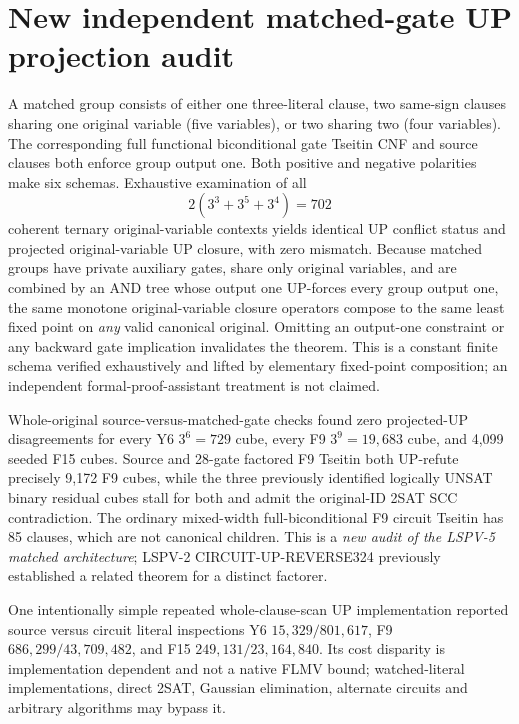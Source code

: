 \documentclass[11pt]{article}
\begin{document}
\section{New independent matched-gate UP projection audit}
A matched group consists of either one three-literal clause, two same-sign clauses sharing one original variable (five variables), or two sharing two (four variables). The corresponding full functional biconditional gate Tseitin CNF and source clauses both enforce group output one. Both positive and negative polarities make six schemas. Exhaustive examination of all
\[
2(3^3+3^5+3^4)=702
\]
coherent ternary original-variable contexts yields identical UP conflict status and projected original-variable UP closure, with zero mismatch. Because matched groups have private auxiliary gates, share only original variables, and are combined by an AND tree whose output one UP-forces every group output one, the same monotone original-variable closure operators compose to the same least fixed point on \emph{any} valid canonical original. Omitting an output-one constraint or any backward gate implication invalidates the theorem. This is a constant finite schema verified exhaustively and lifted by elementary fixed-point composition; an independent formal-proof-assistant treatment is not claimed.

Whole-original source-versus-matched-gate checks found zero projected-UP disagreements for every Y6 $3^6=729$ cube, every F9 $3^9=19{,}683$ cube, and 4,099 seeded F15 cubes. Source and 28-gate factored F9 Tseitin both UP-refute precisely 9,172 F9 cubes, while the three previously identified logically UNSAT binary residual cubes stall for both and admit the original-ID 2SAT SCC contradiction. The ordinary mixed-width full-biconditional F9 circuit Tseitin has 85 clauses, which are not canonical children. This is a \emph{new audit of the LSPV-5 matched architecture}; LSPV-2 CIRCUIT-UP-REVERSE324 previously established a related theorem for a distinct factorer.

One intentionally simple repeated whole-clause-scan UP implementation reported source versus circuit literal inspections Y6 $15{,}329/801{,}617$, F9 $686{,}299/43{,}709{,}482$, and F15 $249{,}131/23{,}164{,}840$. Its cost disparity is implementation dependent and not a native FLMV bound; watched-literal implementations, direct 2SAT, Gaussian elimination, alternate circuits and arbitrary algorithms may bypass it.
\end{document}
